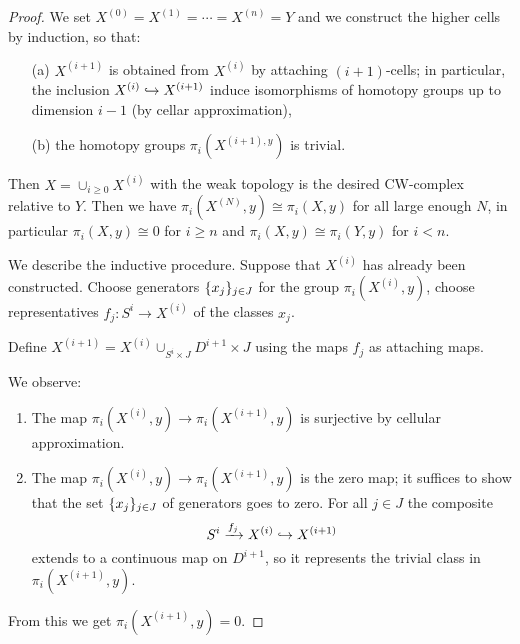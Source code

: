 \begin{proof}
We set $X^{(0)}=X^{(1)}=\cdots=X^{(n)}=Y$ and we construct the higher cells by induction, so that:
\begin{itemize}
    \item[(a)] $X^{(i+1)}$ is obtained from $X^{(i)}$ by attaching $(i+1)$-cells; in particular, the inclusion $X^{(i)}\hookrightarrow X^{(i+1)}$ induce isomorphisms of homotopy groups up to dimension $i-1$ (by cellar approximation),
    \item[(b)] the homotopy groups $\pi_i(X^{(i+1),y})$ is trivial.
\end{itemize}

Then $X=\cup_{i\geq0}X^{(i)}$ with the weak topology is the desired CW-complex relative to $Y$. Then we have $\pi_i(X^{(N)},y)\cong\pi_i(X,y)$ for all large enough $N$, in particular $\pi_i(X,y)\cong 0$ for $i\geq n$ and $\pi_i(X,y)\cong\pi_i(Y,y)$ for $i<n$.

We describe the inductive procedure. Suppose that $X^{(i)}$ has already been constructed. Choose generators $\{x_j\}_{j\in J}$ for the group $\pi_i(X^{(i)},y)$, choose representatives $f_j:S^i\to X^{(i)}$ of the classes $x_j$.

Define $X^{(i+1)}=X^{(i)}\cup_{S^i\times J}D^{i+1}\times J$ using the maps $f_j$ as attaching maps.

We observe:
\begin{enumerate}
    \item The map $\pi_i(X^{(i)},y)\to\pi_i(X^{(i+1)},y)$ is surjective by cellular approximation.
    \item The map $\pi_i(X^{(i)},y)\to\pi_i(X^{(i+1)},y)$ is the zero map; it suffices to show that the set $\{x_j\}_{j\in J}$ of generators goes to zero. For all $j\in J$ the composite
    \[S^i\xrightarrow{f_j}X^{(i)}\hookrightarrow X^{(i+1)}\]
    extends to a continuous map on $D^{i+1}$, so it represents the trivial class in $\pi_i(X^{(i+1)},y)$.
\end{enumerate}

From this we get $\pi_i(X^{(i+1)},y)=0$.
\end{proof}
